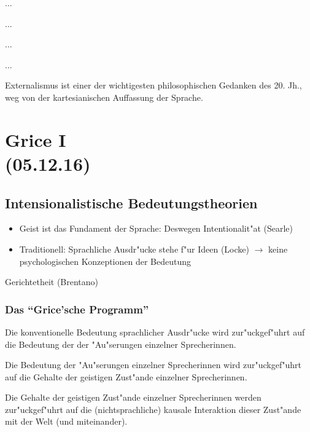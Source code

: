 \documentclass[emulatestandardclasses]{scrartcl}
\begin{document}
\begin{description}[leftmargin=!,labelwidth=\widthof{\bfseries Semantischer Externalismus}]
    \item[Semantischer Internalismus] ...
    \item[Semantischer Externalismus] ...
    \item[Kausaler Externalismus] ...
    \item[Sozialer Externalismus] ...
\end{description}

Externalismus ist einer der wichtigesten philosophischen Gedanken des 20. Jh., weg von der kartesianischen Auffassung der Sprache. 



\section{Grice I\\(05.12.16)}

\subsection{Intensionalistische Bedeutungstheorien}


\begin{itemize}
  \item Geist ist das Fundament der Sprache: Deswegen Intentionalit"at (Searle)
  \item Traditionell: Sprachliche Ausdr"ucke stehe f"ur Ideen (Locke) $\rightarrow$ keine psychologischen Konzeptionen der Bedeutung
\end{itemize}

\begin{description}[leftmargin=!,labelwidth=\widthof{\bfseries Semantischer Externalismus}]
    \item[Intentionalit"at] Gerichtetheit (Brentano) 
\end{description}

\subsubsection{Das "`Grice'sche Programm"'}

\begin{description}[leftmargin=!,labelwidth=\widthof{\bfseries 11}]
    \item[1] Die konventionelle Bedeutung sprachlicher Ausdr"ucke wird zur"uckgef"uhrt auf die Bedeutung der der "Au"serungen einzelner Sprecherinnen.
    \item[2] Die Bedeutung der "Au"serungen einzelner Sprecherinnen wird zur"uckgef"uhrt auf die Gehalte der geistigen Zust"ande einzelner Sprecherinnen.
    \item[3] Die Gehalte der geistigen Zust"ande einzelner Sprecherinnen werden zur"uckgef"uhrt auf die (nichtsprachliche) kausale Interaktion dieser Zust"ande mit der Welt (und miteinander).
\end{description}
\end{document}
